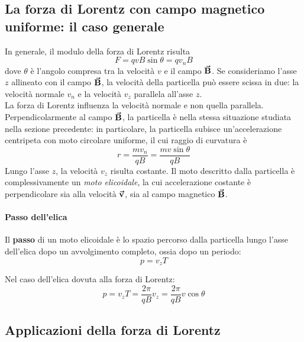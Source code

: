 \subsection{La forza di Lorentz con campo magnetico uniforme: il caso generale}
In generale, il modulo della forza di Lorentz risulta
\begin{equation*}
	F=qvB\sin\theta=q v_n B
\end{equation*}
dove $\theta$ è l'angolo compresa tra la velocità $v$ e il campo $\vb*{\va{B}}$. Se consideriamo l'asse $z$ allineato con il campo $\vb*{\va{B}}$, la velocità della particella può essere scissa in due: la velocità normale $v_n$ e la velocità $v_z$ parallela all'asse $z$.\\
La forza di Lorentz influenza la velocità normale e non quella parallela. Perpendicolarmente al campo $\vb*{\va{B}}$, la particella è nella stessa situazione studiata nella sezione precedente: in particolare, la particella subisce un'accelerazione centripeta con moto circolare uniforme, il cui raggio di curvatura è
\begin{equation}
	r=\frac{mv_n}{qB}=\frac{mv\sin\theta}{qB}
\end{equation}
Lungo l'asse $z$, la velocità $v_z$ risulta costante. Il moto descritto dalla particella è complessivamente un \textit{moto elicoidale}, la cui accelerazione costante è perpendicolare sia alla velocità $\vb*{\va{v}}$, sia al campo magnetico $\vb*{\va{B}}$.\\
\paragraph{Passo dell'elica}
\begin{define}
	Il \textbf{passo} di un moto elicoidale  è lo spazio percorso dalla particella lungo l'asse dell'elica dopo un avvolgimento completo, ossia dopo un periodo:
	\begin{equation}
		p=v_zT
	\end{equation}
\end{define}
Nel caso dell'elica dovuta alla forza di Lorentz:
\begin{equation}
	p=v_zT=\frac{2\pi}{qB}v_z=\frac{2\pi}{qB}v\cos\theta
\end{equation}
\subsection{Applicazioni della forza di Lorentz}

